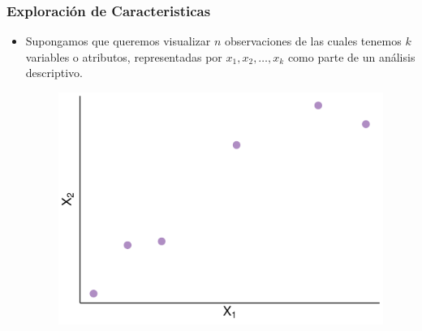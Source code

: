 \documentclass[
  shownotes,
  xcolor={svgnames},
  hyperref={colorlinks,citecolor=DarkBlue,linkcolor=DarkRed,urlcolor=DarkBlue}
  , aspectratio=169]{beamer}
\begin{document}
\begin{frame}
\frametitle{Exploración de Caracteristicas}







\begin{itemize}
\item Supongamos que queremos visualizar \(n\) observaciones de las cuales tenemos \(k\) variables o atributos, representadas por \(x_1,x_2,\dots,x_k\) como parte de un análisis descriptivo. 


\begin{figure}[H] \centering

    \centering
    \includegraphics[scale=.35]{figures/plot1ba}
  \\
  \tiny
\end{figure}
\end{itemize}



\end{frame}
\end{document}
